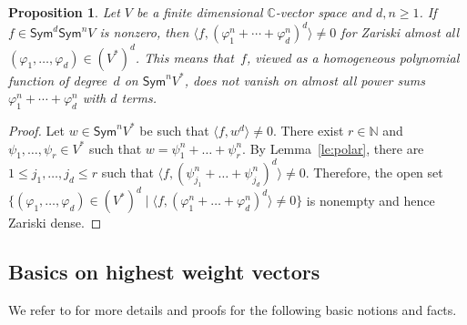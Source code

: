 \documentclass[11pt]{amsart}
\def\N{\mathbb{N}}
\def\C{\mathbb{C}}
\def\det{\mathrm{det}}
\def\Sym{\mathsf{Sym}}
\newcommand{\Det}{\Omega}
\numberwithin{equation}{section}
\newtheorem{proposition}[theorem]{Proposition}
\begin{document}

\begin{proposition}\label{cor:nonvanishing}
Let $V$ be a finite dimensional $\C$-vector space and $d,n\ge 1$. 
If $f\in\Sym^d\Sym^n V$ is nonzero, then 
$\langle f, (\varphi_1^n + \cdots + \varphi_d^n)^d \rangle \ne 0$ 
for Zariski almost all $(\varphi_1,\ldots,\varphi_d) \in (V^*)^d$. 
This means that~$f$, viewed as a homogeneous polynomial function of degree~$d$ 
on $\Sym^n V^*$, does not vanish on almost all power sums $\varphi_1^n + \cdots + \varphi_d^n$ 
with $d$ terms.
\end{proposition}

\begin{proof} 
Let $w\in \Sym^n V^*$ be such that $\langle f, w^d \rangle \ne 0$. 
There exist $r\in\N$ and 
$\psi_1,\ldots,\psi_r \in V^*$ such that 
$w=\psi_1^n +\ldots + \psi_r^n$. By Lemma~\ref{le:polar}, there are 
$1\le j_1,\ldots,j_d \le r$ such that 
$\langle f, (\psi_{j_1}^n +\ldots + \psi_{j_d}^n)^d \rangle \ne 0$. 
Therefore, the open set 
$\{(\varphi_1,\ldots,\varphi_d) \in (V^*)^d \mid \langle f, (\varphi_1^n +\ldots +\varphi_d^n)^d \rangle\ne 0 \}$ 
is nonempty and hence Zariski dense. 
\end{proof}



\subsection{Basics on highest weight vectors}\label{sec:hwvs}

We refer to \cite{FH:91} for more details and proofs for the following basic notions and facts.
\end{document}
